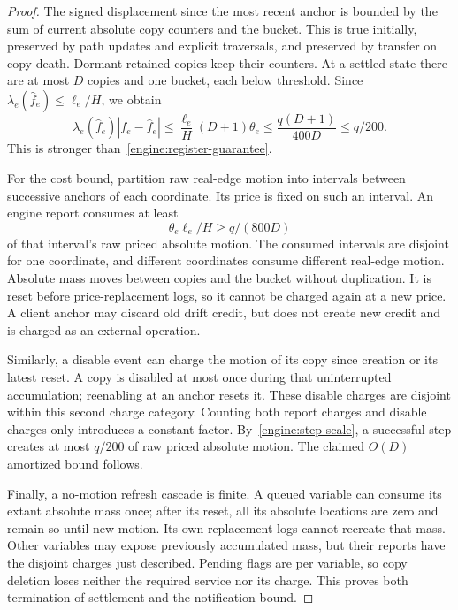 \begin{proof}
The signed displacement since the most recent anchor is bounded by the
sum of current absolute copy counters and the bucket.  This is true
initially, preserved by path updates and explicit traversals, and
preserved by transfer on copy death.  Dormant retained copies keep their
counters.  At a settled state there are at most $D$ copies and one
bucket, each below threshold.  Since
$\lambda_e(\widehat f_e)\le\ell_e/H$, we obtain
\[
 \lambda_e(\widehat f_e)|f_e-\widehat f_e|
 \le \frac{\ell_e}{H}(D+1)\theta_e
 \le \frac{q(D+1)}{400D}\le q/200.
\]
This is stronger than~\eqref{engine:register-guarantee}.

For the cost bound, partition raw real-edge motion into intervals between
successive anchors of each coordinate.  Its price is fixed on such an
interval.  An engine report consumes at least
\[
                       \theta_e\ell_e/H\ge q/(800D)
\]
of that interval's raw priced absolute motion.  The consumed intervals
are disjoint for one coordinate, and different coordinates consume
different real-edge motion.  Absolute mass moves between copies and the
bucket without duplication.  It is reset before price-replacement logs,
so it cannot be charged again at a new price.  A client anchor may
discard old drift credit, but does not create new credit and is charged
as an external operation.

Similarly, a disable event can charge the motion of its copy since
creation or its latest reset.  A copy is disabled at most once during
that uninterrupted accumulation; reenabling at an anchor resets it.
These disable charges are disjoint within this second charge category.
Counting both report charges and disable charges only introduces a
constant factor.  By~\eqref{engine:step-scale}, a successful step creates
at most $q/200$ of raw priced absolute motion.  The claimed $O(D)$
amortized bound follows.

Finally, a no-motion refresh cascade is finite.  A queued variable can
consume its extant absolute mass once; after its reset, all its absolute
locations are zero and remain so until new motion.  Its own replacement
logs cannot recreate that mass.  Other variables may expose previously
accumulated mass, but their reports have the disjoint charges just
described.  Pending flags are per variable, so copy deletion loses
neither the required service nor its charge.  This proves both
termination of settlement and the notification bound.
\end{proof}

